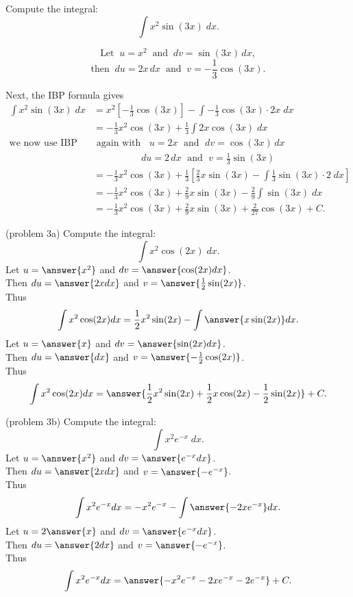 \documentclass{ximera}
\begin{document}
\begin{example}
Compute the integral:
  \[
  \int x^2\sin(3x) \;dx.
  \]

\[
\text{Let} \;\; u = x^2 \;\; \text{and} \;\; dv = \sin(3x) \,dx,
\]
\[
\text{then} \;\; du = 2x \,dx \;\; \text{and} \;\; v = -\frac13 \cos(3x).
\]

Next, the IBP formula gives
\begin{align*}
\int x^2\sin(3x) \;dx &= x^2\left[-\frac13 \cos(3x)\right] - \int -\frac13 \cos(3x) \cdot 2x \; dx \\
                       &= -\frac13 x^2\cos(3x) + \frac13 \int 2x\cos(3x) \; dx\\                               
\text{we now use IBP} & \text{ again with } \;\; u = 2x \;\text{ and } \; dv = \cos(3x) \, dx\\
& \qquad \qquad \quad du = 2 \, dx \; \text{ and } \; v=\frac13 \sin(3x)\\
                       &= -\frac13 x^2\cos(3x) + \frac13\left[\frac23x\sin(3x) -  \int \frac13 \sin(3x)\cdot 2 \; dx\right]\\
                       &= -\frac13 x^2\cos(3x) + \frac29x\sin(3x) - \frac29 \int  \sin(3x) \; dx\\
                       &= -\frac13 x^2\cos(3x) + \frac29x\sin(3x) + \frac{2}{27} \cos(3x) + C.
\end{align*}

\end{example}


\begin{problem}(problem 3a)
Compute the integral:
  \[
  \int x^2\cos(2x) \;dx.
  \]
Let $u = \answer{x^2}$   and   $dv = \answer{\cos(2x) dx}$.\\
  Then $du = \answer{2x dx}$   and   $v = \answer{\frac12 \sin(2x)}$.\\
  Thus 
  \[
  \int x^2 \cos(2x) dx = \frac12 x^2 \sin(2x) -\int \answer{x \sin(2x)} dx.
  \]
Let $u = \answer{x}$   and   $dv = \answer{\sin(2x) dx}$.\\
  Then $du = \answer{dx}$   and   $v = \answer{-\frac12 \cos(2x)}$.\\ 
Thus 
  \[
  \int x^2 \cos(2x) dx = \answer{\frac12 x^2 \sin(2x) + \frac12 x \cos(2x) - \frac12 \sin(2x)} + C.
  \]  

\end{problem}

\begin{problem}(problem 3b)
Compute the integral:
  \[
  \int x^2e^{-x} \;dx.
  \]
Let $u = \answer{x^2}$   and   $dv = \answer{e^{-x} dx}$.\\
  Then $du = \answer{2x dx}$   and   $v = \answer{-e^{-x}}$.\\
  Thus 
  \[
  \int x^2 e^{-x} dx = -x^2 e^{-x} -\int \answer{-2xe^{-x}} dx.
  \]
Let $u = 2\answer{x}$   and   $dv = \answer{e^{-x} dx}$.\\
  Then $du = \answer{2 dx}$   and   $v = \answer{-e^{-x}}$.\\ 
Thus 
  \[
  \int x^2 e^{-x} dx = \answer{-x^2 e^{-x} - 2xe^{-x} - 2e^{-x}} + C.
  \]  
\end{problem}
\end{document}
